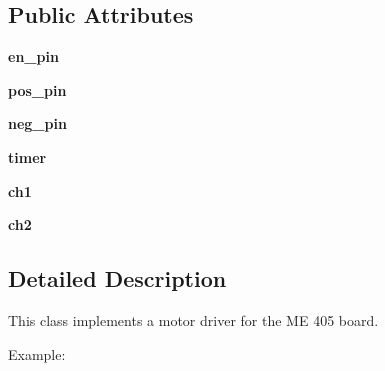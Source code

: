 \subsection*{Public Attributes}
\begin{DoxyCompactItemize}
\item 
{\bfseries en\+\_\+pin}\hypertarget{classmotordriver_1_1MotorDriver_ad71dc559d92083b6fa35c2c7066645a1}{}\label{classmotordriver_1_1MotorDriver_ad71dc559d92083b6fa35c2c7066645a1}

\item 
{\bfseries pos\+\_\+pin}\hypertarget{classmotordriver_1_1MotorDriver_a12cf101e2edf98bb7db442dd69c0b740}{}\label{classmotordriver_1_1MotorDriver_a12cf101e2edf98bb7db442dd69c0b740}

\item 
{\bfseries neg\+\_\+pin}\hypertarget{classmotordriver_1_1MotorDriver_a810012b2449a7f9837a4f3b4a0b001c0}{}\label{classmotordriver_1_1MotorDriver_a810012b2449a7f9837a4f3b4a0b001c0}

\item 
{\bfseries timer}\hypertarget{classmotordriver_1_1MotorDriver_a23e4aa0a8fdccae6f535a9bf6e1af100}{}\label{classmotordriver_1_1MotorDriver_a23e4aa0a8fdccae6f535a9bf6e1af100}

\item 
{\bfseries ch1}\hypertarget{classmotordriver_1_1MotorDriver_ad662bd7e0294918b445f56d6db2b4e02}{}\label{classmotordriver_1_1MotorDriver_ad662bd7e0294918b445f56d6db2b4e02}

\item 
{\bfseries ch2}\hypertarget{classmotordriver_1_1MotorDriver_aa26279eaf817671f0a2b77ce1bdb4bdc}{}\label{classmotordriver_1_1MotorDriver_aa26279eaf817671f0a2b77ce1bdb4bdc}

\end{DoxyCompactItemize}


\subsection{Detailed Description}
This class implements a motor driver for the ME 405 board. 

Example\+: 
 

